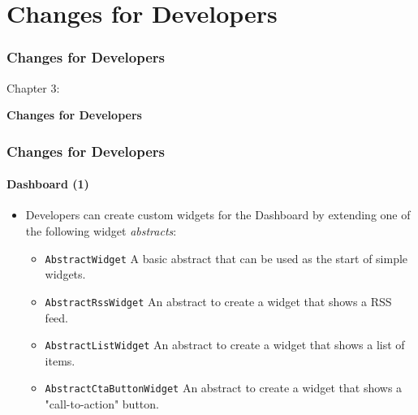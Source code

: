%

\section{Changes for Developers}
\begin{frame}[fragile]
	\frametitle{Changes for Developers}

	\begin{center}\huge{Chapter 3:}\end{center}
	\begin{center}\huge{\color{typo3darkgrey}\textbf{Changes for Developers}}\end{center}

\end{frame}


\begin{frame}[fragile]
	\frametitle{Changes for Developers}
	\framesubtitle{Dashboard (1)}

	\lstset{basicstyle=\smaller\ttfamily}

	\begin{itemize}
		\item Developers can create custom widgets for the Dashboard by extending one of the following widget \textit{abstracts}:

			\begin{itemize}
				\item \texttt{AbstractWidget}\newline
					\small
						A basic abstract that can be used as the start of simple widgets.
					\normalsize
				\item \texttt{AbstractRssWidget}\newline
					\small
						An abstract to create a widget that shows a RSS feed.
					\normalsize
				\item \texttt{AbstractListWidget}\newline
					\small
						An abstract to create a widget that shows a list of items.
					\normalsize
				\item \texttt{AbstractCtaButtonWidget}\newline
					\small
						An abstract to create a widget that shows a "call-to-action" button.
					\normalsize
			\end{itemize}

	\end{itemize}

\end{frame}

